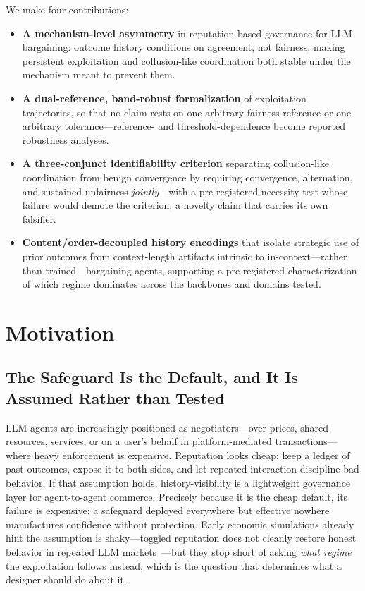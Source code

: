 \documentclass[conference]{IEEEtran}
\begin{document}
We make four contributions:
\begin{itemize}[leftmargin=1.2em]
\item \textbf{A mechanism-level asymmetry} in reputation-based governance for
LLM bargaining: outcome history conditions on agreement, not fairness, making
persistent exploitation and collusion-like coordination both stable under the
mechanism meant to prevent them.
\item \textbf{A dual-reference, band-robust formalization} of exploitation
trajectories, so that no claim rests on one arbitrary fairness reference or
one arbitrary tolerance---reference- and threshold-dependence become reported
robustness analyses.
\item \textbf{A three-conjunct identifiability criterion} separating
collusion-like coordination from benign convergence by requiring convergence,
alternation, and sustained unfairness \emph{jointly}---with a pre-registered
necessity test whose failure would demote the criterion, a novelty claim that
carries its own falsifier.
\item \textbf{Content/order-decoupled history encodings} that isolate
strategic use of prior outcomes from context-length artifacts intrinsic to
in-context---rather than trained---bargaining agents, supporting a
pre-registered characterization of which regime dominates across the backbones
and domains tested.
\end{itemize}

\section{Motivation}\label{sec:motivation}

\subsection{The Safeguard Is the Default, and It Is Assumed Rather than
Tested}
LLM agents are increasingly positioned as negotiators---over prices, shared
resources, services, or on a user's behalf in platform-mediated
transactions---where heavy enforcement is expensive. Reputation looks cheap:
keep a ledger of past outcomes, expose it to both sides, and let repeated
interaction discipline bad behavior. If that assumption holds,
history-visibility is a lightweight governance layer for agent-to-agent
commerce. Precisely because it is the cheap default, its failure is expensive:
a safeguard deployed everywhere but effective nowhere manufactures confidence
without protection. Early economic simulations already hint the assumption is
shaky---toggled reputation does not cleanly restore honest behavior in
repeated LLM markets~\cite{erlei2026llmmarkets}---but they stop short of
asking \emph{what regime} the exploitation follows instead, which is the
question that determines what a designer should do about it.
\end{document}
